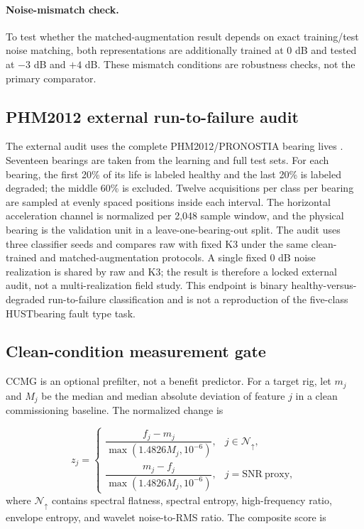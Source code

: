 \documentclass[11pt]{article}
\begin{document}
\paragraph{Noise-mismatch check.}
To test whether the matched-augmentation result depends on exact training/test
noise matching, both representations are additionally trained at 0 dB and
tested at $-3$ dB and $+4$ dB. These mismatch conditions are robustness checks,
not the primary comparator.

\subsection{PHM2012 external run-to-failure audit}

The external audit uses the complete PHM2012/PRONOSTIA bearing lives
\citep{pronostia2012}. Seventeen bearings are taken from the learning and full
test sets. For each bearing, the first 20\% of its life is labeled healthy and
the last 20\% is labeled degraded; the middle 60\% is excluded. Twelve
acquisitions per class per bearing are sampled at evenly spaced positions inside
each interval. The horizontal acceleration channel is normalized per 2,048
sample window, and the physical bearing is the validation unit in a
leave-one-bearing-out split. The audit uses three classifier seeds and compares
raw with fixed K3 under the same clean-trained and matched-augmentation
protocols. A single fixed 0 dB noise realization is shared by raw and K3; the
result is therefore a locked external audit, not a multi-realization field
study. This endpoint is binary healthy-versus-degraded run-to-failure
classification and is not a reproduction of the five-class HUSTbearing fault
type task.

\subsection{Clean-condition measurement gate}

CCMG is an optional prefilter, not a benefit predictor. For a target rig, let
$m_j$ and $M_j$ be the median and median absolute deviation of feature $j$ in
a clean commissioning baseline. The normalized change is

\begin{equation}
z_j=
\begin{cases}
\dfrac{f_j-m_j}{\max(1.4826M_j,10^{-6})}, & j\in\mathcal{N}_{\uparrow},\\[6pt]
\dfrac{m_j-f_j}{\max(1.4826M_j,10^{-6})}, & j=\mathrm{SNR\ proxy},
\end{cases}
\label{eq:gate-z}
\end{equation}
where $\mathcal{N}_{\uparrow}$ contains spectral flatness, spectral entropy,
high-frequency ratio, envelope entropy, and wavelet noise-to-RMS ratio. The
composite score is
\end{document}
